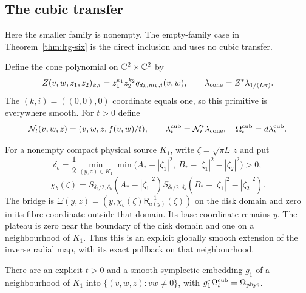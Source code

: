 \subsection{The cubic transfer}\label{sec:sxr-transport}

Here the smaller family is nonempty. The empty-family case in Theorem~\ref{thm:lrg-six} is the direct inclusion and uses no cubic transfer.

Define the cone polynomial on $\mathbb{C}^2\times\mathbb{C}^2$ by
\[
 Z(v,w,z_1,z_2)_{k,i}=z_1^{k_1}z_2^{k_2}q_{d_k,m_k,i}(v,w),
 \qquad \lambda_{\rm cone}=Z^*\lambda_{1/(L\pi)}.
\]
The $(k,i)=((0,0),0)$ coordinate equals one, so this primitive is everywhere smooth.
For $t>0$ define
\[
 \mathcal N_t(v,w,z)=(v,w,z,f(v,w)/t),\qquad
 \lambda_t^{\rm cub}=\mathcal N_t^*\lambda_{\rm cone},\quad
 \Omega_t^{\rm cub}=d\lambda_t^{\rm cub}.
\]

For a nonempty compact physical source $K_1$, write $\zeta=\sqrt{\pi L}\,z$ and put
\[
 \delta_b=\frac12\min_{(y,z)\in K_1}
   \min\bigl(A_*-|\zeta_1|^2,\ B_*-|\zeta_1|^2-|\zeta_2|^2\bigr)>0,
\]
\[
 \chi_b(\zeta)=S_{\delta_b/2,\delta_b}(A_*-|\zeta_1|^2)
 S_{\delta_b/2,\delta_b}(B_*-|\zeta_1|^2-|\zeta_2|^2).
\]
The bridge is
$\Xi(y,z)=(y,\chi_b(\zeta)\mathsf R_{a(y)}^{-1}(\zeta))$ on the disk domain and zero in its fibre
coordinate outside that domain. Its base coordinate remains $y$.
The plateau is zero near the boundary of the disk domain and one on a neighbourhood of $K_1$.
Thus this is an explicit globally smooth extension of the inverse radial map, with its exact pullback on that neighbourhood.

\begin{proposition}\label{prop:sxr-transport}
There are an explicit $t>0$ and a smooth symplectic embedding $g_1$ of a
neighbourhood of $K_1$ into
$\{(v,w,z):vw\ne0\}$, with $g_1^*\Omega_t^{\rm cub}=\Omega_{\rm phys}$.
\end{proposition}

